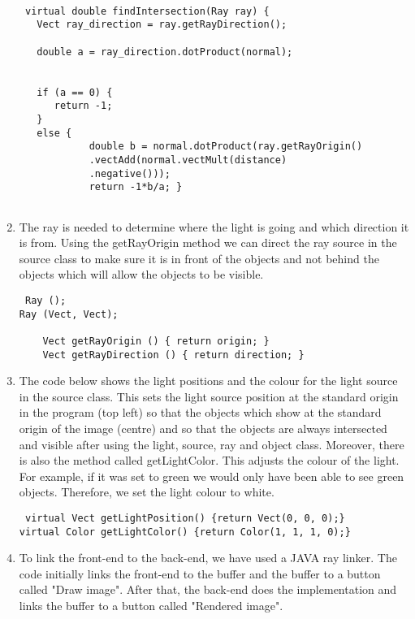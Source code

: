 \documentclass{article}
\begin{document}
\begin{enumerate}
 \begin{lstlisting} 
 
 virtual double findIntersection(Ray ray) {
   Vect ray_direction = ray.getRayDirection();

   double a = ray_direction.dotProduct(normal); 
   

   if (a == 0) {
      return -1;
   }
   else {
            double b = normal.dotProduct(ray.getRayOrigin()
            .vectAdd(normal.vectMult(distance)
            .negative()));
            return -1*b/a; }
 
 \end{lstlisting}
 
 \item The ray is needed to determine where the light is going and which direction it is from. Using the getRayOrigin method we can direct the ray source in the source class to make sure it is in front of the objects and not behind the objects which will allow the  objects to be visible.
 
 \begin{lstlisting}
 Ray ();
Ray (Vect, Vect);

    Vect getRayOrigin () { return origin; }
    Vect getRayDirection () { return direction; }
 \end{lstlisting}
 
 \item 
 The code below shows the light positions and the colour for the light source in the source class. This sets the light source position at the standard origin in the program (top left) so that the objects which show at the standard origin of the image (centre) and so that the objects are always intersected and visible after using the light, source, ray and object class. Moreover, there is also the method called getLightColor. This adjusts the colour of the light. For example, if it was set to green we would only have been able to see green objects. Therefore, we set the light colour to white.
 
 \begin{lstlisting}
 virtual Vect getLightPosition() {return Vect(0, 0, 0);}
virtual Color getLightColor() {return Color(1, 1, 1, 0);}
 \end{lstlisting}
 
 \item To link the front-end to the back-end, we have used a JAVA ray linker. The code initially links the front-end to the buffer and the buffer to a button called "Draw image". After that, the back-end does the implementation and links the buffer to a button called "Rendered image".
 

\end{enumerate}
\end{document}
